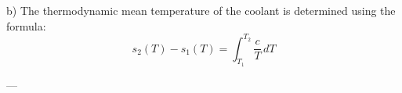 b) The thermodynamic mean temperature of the coolant is determined using the formula:  
\[
s_2(T) - s_1(T) = \int_{T_1}^{T_2} \frac{c}{T} \, dT
\]  

---
